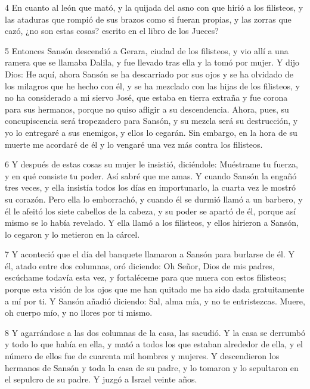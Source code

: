 \par 4 En cuanto al león que mató, y la quijada del asno con que hirió a los filisteos, y las ataduras que rompió de sus brazos como si fueran propias, y las zorras que cazó, ¿no son estas cosas? escrito en el libro de los Jueces?

\par 5 Entonces Sansón descendió a Gerara, ciudad de los filisteos, y vio allí a una ramera que se llamaba Dalila, y fue llevado tras ella y la tomó por mujer. Y dijo Dios: He aquí, ahora Sansón se ha descarriado por sus ojos y se ha olvidado de los milagros que he hecho con él, y se ha mezclado con las hijas de los filisteos, y no ha considerado a mi siervo José, que estaba en tierra extraña y fue corona para sus hermanos, porque no quiso afligir a su descendencia. Ahora, pues, su concupiscencia será tropezadero para Sansón, y su mezcla será su destrucción, y yo lo entregaré a sus enemigos, y ellos lo cegarán. Sin embargo, en la hora de su muerte me acordaré de él y lo vengaré una vez más contra los filisteos.

\par 6 Y después de estas cosas su mujer le insistió, diciéndole: Muéstrame tu fuerza, y en qué consiste tu poder. Así sabré que me amas. Y cuando Sansón la engañó tres veces, y ella insistía todos los días en importunarlo, la cuarta vez le mostró su corazón. Pero ella lo emborrachó, y cuando él se durmió llamó a un barbero, y él le afeitó los siete cabellos de la cabeza, y su poder se apartó de él, porque así mismo se lo había revelado. Y ella llamó a los filisteos, y ellos hirieron a Sansón, lo cegaron y lo metieron en la cárcel.

\par 7 Y aconteció que el día del banquete llamaron a Sansón para burlarse de él. Y él, atado entre dos columnas, oró diciendo: Oh Señor, Dios de mis padres, escúchame todavía esta vez, y fortaléceme para que muera con estos filisteos; porque esta visión de los ojos que me han quitado me ha sido dada gratuitamente a mí por ti. Y Sansón añadió diciendo: Sal, alma mía, y no te entristezcas. Muere, oh cuerpo mío, y no llores por ti mismo.

\par 8 Y agarrándose a las dos columnas de la casa, las sacudió. Y la casa se derrumbó y todo lo que había en ella, y mató a todos los que estaban alrededor de ella, y el número de ellos fue de cuarenta mil hombres y mujeres. Y descendieron los hermanos de Sansón y toda la casa de su padre, y lo tomaron y lo sepultaron en el sepulcro de su padre. Y juzgó a Israel veinte años.

